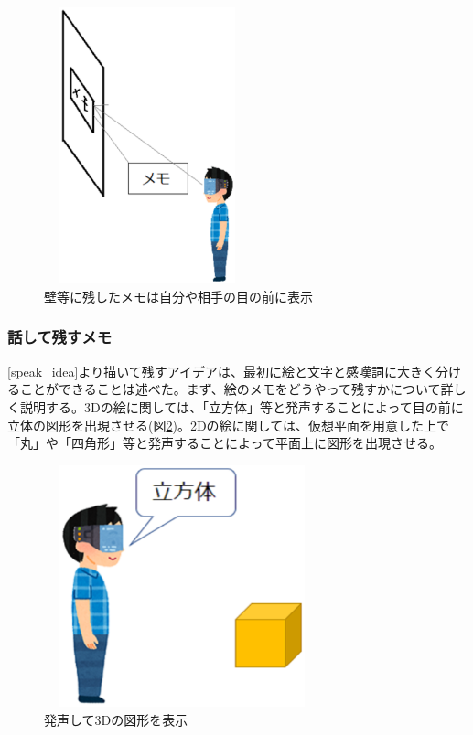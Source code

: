 \documentclass[11pt,a4j, titlepage]{jarticle} %
\begin{document}
\begin{figure}[H]
  \begin{center}
    \includegraphics[clip,height=8.0cm,width=6.0cm]{./memo_wall.eps}
    \caption{壁等に残したメモは自分や相手の目の前に表示}
    \label{fig:memo_wall}
  \end{center}
\end{figure}

\subsubsection{話して残すメモ}
\ref{speak_idea}より描いて残すアイデアは、最初に絵と文字と感嘆詞に大きく分けることができることは述べた。まず、絵のメモをどうやって残すかについて詳しく説明する。3Dの絵に関しては、「立方体」等と発声することによって目の前に立体の図形を出現させる(図\ref{fig:speak_3d})。2Dの絵に関しては、仮想平面を用意した上で「丸」や「四角形」等と発声することによって平面上に図形を出現させる。

\begin{figure}[H]
  \begin{center}
    \includegraphics[clip,height=7.0cm,width=8.0cm]{./speak_3d.eps}
    \caption{発声して3Dの図形を表示}
    \label{fig:speak_3d}
  \end{center}
\end{figure}
\end{document}
